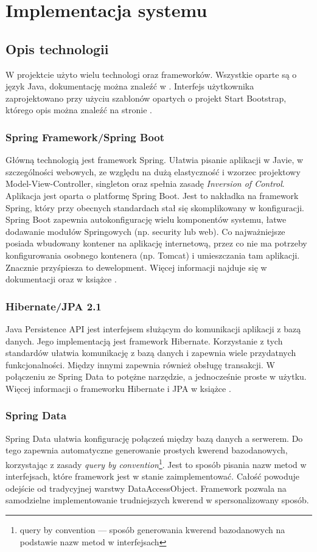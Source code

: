 \chapter{Implementacja systemu}
\thispagestyle{chapterBeginStyle}

\section{Opis technologii}
W projektcie użyto wielu technologi oraz frameworków. Wszystkie oparte są o język Java, dokumentację można znaleźć w \cite{Java-doc}. Interfejs użytkownika zaprojektowano przy użyciu szablonów opartych o projekt Start Bootstrap, którego opis można znaleźć na stronie \cite{sb}. 

\subsection{Spring Framework/Spring Boot}
Główną technologią jest framework Spring. Ułatwia pisanie aplikacji w Javie, w szczególności webowych, ze względu na dużą elastyczność i wzorzec projektowy Model-View-Controller, singleton oraz spełnia zasadę \textit{Inversion of Control}. Aplikacja jest oparta o platformę Spring Boot. Jest to nakładka na framework Spring, który przy obecnych standardach stał się skomplikowany w konfiguracji. Spring Boot zapewnia autokonfigurację wielu komponentów systemu, łatwe dodawanie modułów Springowych (np. security lub web). Co najważniejsze posiada wbudowany kontener na aplikację internetową, przez co nie ma potrzeby konfigurowania osobnego kontenera (np. Tomcat) i umieszczania tam aplikacji. Znacznie przyśpiesza to dewelopment. Więcej informacji najduje się w dokumentacji \cite{springb-docs} oraz w książce \cite{springbook}.

\subsection{Hibernate/JPA 2.1} 
Java Persistence API jest interfejsem służącym do komunikacji aplikacji z bazą danych. Jego implementacją jest framework Hibernate. Korzystanie z tych standardów ułatwia komunikację z bazą danych i zapewnia wiele przydatnych funkcjonalności. Między innymi zapewnia również obsługę transakcji. W połączeniu ze Spring Data to potężne narzędzie, a jednocześnie proste w użytku. Więcej informacji o frameworku Hibernate i JPA w książce \cite{JPA-hib}. 
\subsection{Spring Data}
Spring Data ułatwia konfigurację połączeń między bazą danych a serwerem. Do tego zapewnia automatyczne generowanie prostych kwerend bazodanowych, korzystając z zasady \textit{query by convention}\footnote{query by convention — sposób generowania kwerend bazodanowych na podstawie nazw metod w interfejsach}. Jest to sposób pisania nazw metod w interfejsach, które framework jest w stanie zaimplementować. Całość powoduje odejście od tradycyjnej warstwy DataAccessObject. Framework pozwala na samodzielne implementowanie trudniejszych kwerend w spersonalizowany sposób. 

